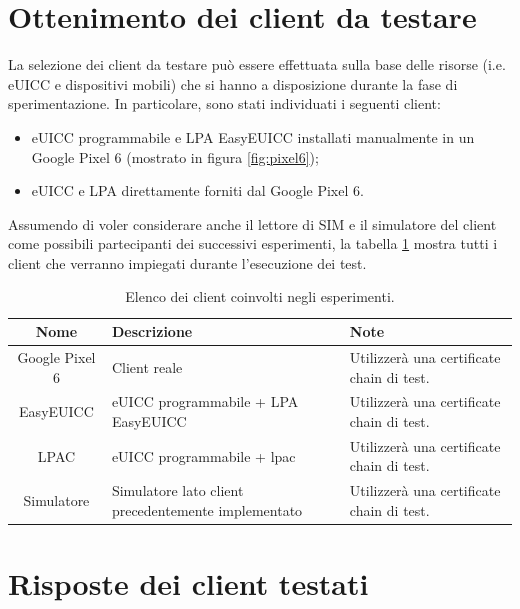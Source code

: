 \documentclass[10pt, oneside]{book}
\begin{document}
\section{Ottenimento dei client da testare}
La selezione dei client da testare può essere effettuata sulla base delle risorse (i.e. eUICC e dispositivi mobili) che si hanno a disposizione durante la fase di sperimentazione. In particolare, sono stati individuati i seguenti client:
\begin{itemize}
\item eUICC programmabile e LPA EasyEUICC installati manualmente in un Google Pixel 6 (mostrato in figura \ref{fig:pixel6});
\item eUICC e LPA direttamente forniti dal Google Pixel 6.
\end{itemize}
Assumendo di voler considerare anche il lettore di SIM e il simulatore del client come possibili partecipanti dei successivi esperimenti, la tabella \ref{tab:all-clients} mostra tutti i client che verranno impiegati durante l'esecuzione dei test.

\begin{table}[h!]
\begin{center}
\captionsetup{skip=4pt}
\caption{Elenco dei client coinvolti negli esperimenti.}
\label{tab:all-clients}
\begin{tabularx}{\textwidth}{|c|X|X|} %
\hline
\textbf{Nome} & \textbf{Descrizione} & \textbf{Note}\\
\hline
Google Pixel 6 & Client reale & Utilizzerà una certificate chain di test.\\
\hline
EasyEUICC & eUICC programmabile + LPA EasyEUICC & Utilizzerà una certificate chain di test.\\
\hline
LPAC & eUICC programmabile + lpac & Utilizzerà una certificate chain di test.\\
\hline
Simulatore & Simulatore lato client precedentemente implementato & Utilizzerà una certificate chain di test.\\
\hline
\end{tabularx}
\end{center}
\end{table}

\section{Risposte dei client testati}
\end{document}
